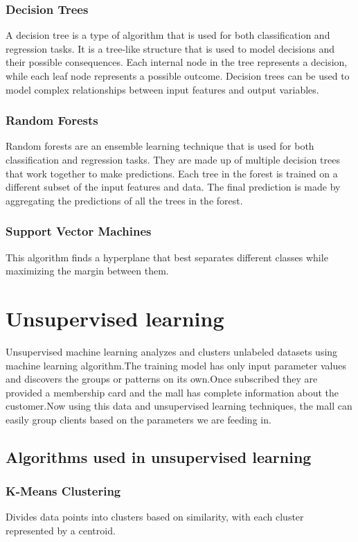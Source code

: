 \documentclass[12pt]{article}
\begin{document}
 \subsubsection{Decision Trees}
A decision tree is a type of algorithm that is used for both classification and regression tasks. It is a tree-like structure that is used to model decisions and their possible consequences. Each internal node in the tree represents a decision, while each leaf node represents a possible outcome. Decision trees can be used to model complex relationships between input features and output variables.

 \subsubsection{Random Forests}
Random forests are an ensemble learning technique that is used for both classification and regression tasks. They are made up of multiple decision trees that work together to make predictions. Each tree in the forest is trained on a different subset of the input features and data. The final prediction is made by aggregating the predictions of all the trees in the forest.

 \subsubsection{Support Vector Machines}
 This algorithm finds a hyperplane that best separates different classes while maximizing the margin between them.
 \section{Unsupervised learning}
 Unsupervised machine learning analyzes and clusters unlabeled datasets using machine learning algorithm.The training model has only input parameter values and discovers the groups or patterns on its own.Once subscribed they are provided a membership card and the mall has complete information about the customer.Now using this data and unsupervised learning techniques, the mall can easily group clients based on the parameters we are feeding in.
 \subsection{Algorithms used in unsupervised learning}
\subsubsection{K-Means Clustering} 
Divides data points into clusters based on similarity, with each cluster represented by a centroid.
\end{document}

